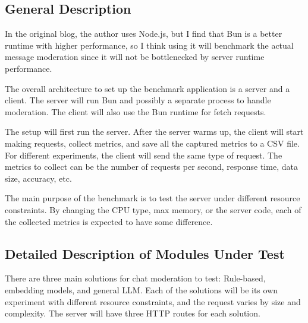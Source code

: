 \documentclass[
	english,
	accentcolor=9c,
	type=intern,
	marginpar=false,
	11pt
]{tudapub}
\begin{document}
\subsection{General Description}
In the original blog\cite{cost-effective-moderation}, the author uses Node.js, but I find that Bun is a better runtime with higher performance, so I think using it will benchmark the actual message moderation since it will not be bottlenecked by server runtime performance.

The overall architecture to set up the benchmark application is a server and a client.
The server will run Bun and possibly a separate process to handle moderation.
The client will also use the Bun runtime for fetch requests.

The setup will first run the server.
After the server warms up, the client will start making requests, collect metrics, and save all the captured metrics to a CSV file.
For different experiments, the client will send the same type of request.
The metrics to collect can be the number of requests per second, response time, data size, accuracy, etc.

The main purpose of the benchmark is to test the server under different resource constraints.
By changing the CPU type, max memory, or the server code, each of the collected metrics is expected to have some difference.
\subsection{Detailed Description of Modules Under Test}
There are three main solutions for chat moderation to test: Rule-based, embedding models, and general LLM.
Each of the solutions will be its own experiment with different resource constraints, and the request varies by size and complexity.
The server will have three HTTP routes for each solution.
\end{document}
